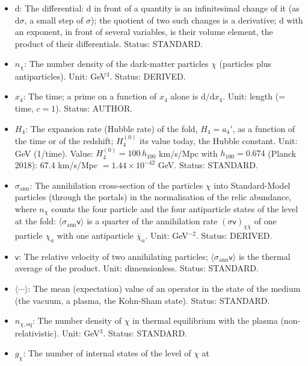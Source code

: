 \documentclass[
  10pt,
]{article}
\providecommand{\tightlist}{%
  \setlength{\itemsep}{0pt}\setlength{\parskip}{0pt}}
\begin{document}
\begin{itemize}
\tightlist
\item
  \(\mathrm{d}\): The differential: \(\mathrm{d}\) in front of a
  quantity is an infinitesimal change of it (as \(\mathrm{d}\sigma\), a
  small step of \(\sigma\)); the quotient of two such changes is a
  derivative; \(\mathrm{d}\) with an exponent, in front of several
  variables, is their volume element, the product of their
  differentials. Status: STANDARD.
\item
  \(n_\chi\): The number density of the dark-matter particles \(\chi\)
  (particles plus antiparticles). Unit: GeV\(^3\). Status: DERIVED.
\item
  \(x_4\): The time; a prime on a function of \(x_4\) alone is
  \(\mathrm{d}/\mathrm{d}x_4\). Unit: length (= time, \(c = 1\)).
  Status: AUTHOR.
\item
  \(H_4\): The expansion rate (Hubble rate) of the fold, \(H_4 = a_4'\),
  as a function of the time or of the redshift; \(H_4^{(0)}\) its value
  today, the Hubble constant. Unit: GeV (1/time). Value:
  \(H_4^{(0)} = 100\,h_{100}\) km/s/Mpc with \(h_{100} = 0.674\) (Planck
  2018): 67.4 km/s/Mpc \(= 1.44\times10^{-42}\) GeV. Status: STANDARD.
\item
  \(\sigma_{\mathrm{ann}}\): The annihilation cross-section of the
  particles \(\chi\) into Standard-Model particles (through the portals)
  in the normalisation of the relic abundance, where \(n_\chi\) counts
  the four particle and the four antiparticle states of the level at the
  fold: \(\langle\sigma_{\mathrm{ann}}\mathsf{v}\rangle\) is a quarter
  of the annihilation rate \((\sigma\mathsf{v})_{\chi\bar\chi}\) of one
  particle \(\chi_a\) with one antiparticle \(\bar\chi_a\). Unit:
  GeV\(^{-2}\). Status: DERIVED.
\item
  \(\mathsf{v}\): The relative velocity of two annihilating particles;
  \(\langle\sigma_{\mathrm{ann}}\mathsf{v}\rangle\) is the thermal
  average of the product. Unit: dimensionless. Status: STANDARD.
\item
  \(\langle\cdots\rangle\): The mean (expectation) value of an operator
  in the state of the medium (the vacuum, a plasma, the Kohn-Sham
  state). Status: STANDARD.
\item
  \(n_{\chi,\mathrm{eq}}\): The number density of \(\chi\) in thermal
  equilibrium with the plasma (non-relativistic). Unit: GeV\(^3\).
  Status: STANDARD.
\item
  \(g_\chi\): The number of internal states of the level of \(\chi\) at

\end{itemize}
\end{document}
